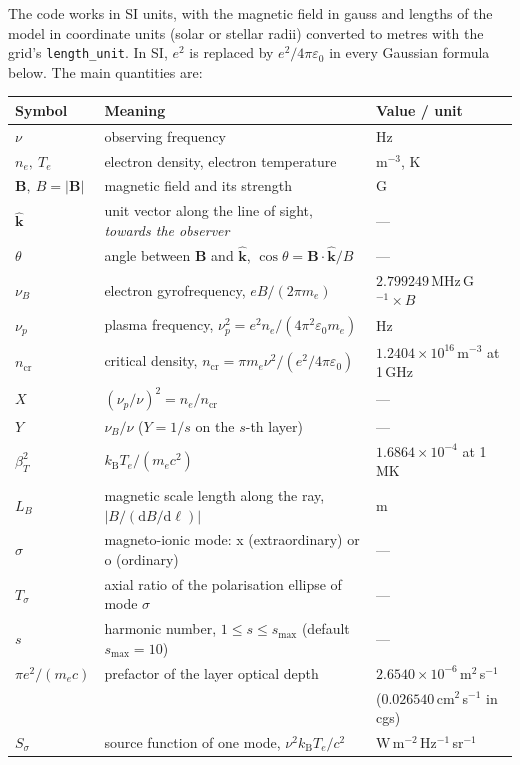 \documentclass[11pt,a4paper]{article}
\newcommand{\code}[1]{\texttt{#1}}
\newcommand{\vect}[1]{\bm{#1}}
\newcommand{\dd}{\mathrm{d}}
\newcommand{\kB}{k_\mathrm{B}}
\newcommand{\ncr}{n_\mathrm{cr}}
\newcommand{\nuB}{\nu_B}
\begin{document}
The code works in SI units, with the magnetic field in gauss and lengths of the model in
coordinate units (solar or stellar radii) converted to metres with the grid's
\code{length\_unit}. In SI, $e^2$ is replaced by $e^2/4\pi\varepsilon_0$ in every Gaussian
formula below. The main quantities are:

\begin{center}
\small
\begin{longtable}{@{}l p{8.3cm} l@{}}
\toprule
Symbol & Meaning & Value / unit \\
\midrule
$\nu$ & observing frequency & Hz \\
$n_e,\ T_e$ & electron density, electron temperature & m$^{-3}$, K \\
$\vect B,\ B=|\vect B|$ & magnetic field and its strength & G \\
$\hat{\vect k}$ & unit vector along the line of sight, \emph{towards the observer} & --- \\
$\theta$ & angle between $\vect B$ and $\hat{\vect k}$, $\cos\theta=\vect B\cdot\hat{\vect k}/B$ & --- \\
$\nuB$ & electron gyrofrequency, $eB/(2\pi m_e)$ & $2.799249$\,MHz\,G$^{-1}\times B$ \\
$\nu_p$ & plasma frequency, $\nu_p^2=e^2n_e/(4\pi^2\varepsilon_0 m_e)$ & Hz \\
$\ncr$ & critical density, $\ncr=\pi m_e\nu^2/(e^2/4\pi\varepsilon_0)$ & $1.2404\times10^{16}$\,m$^{-3}$ at 1\,GHz \\
$X$ & $(\nu_p/\nu)^2=n_e/\ncr$ & --- \\
$Y$ & $\nuB/\nu$ ($Y=1/s$ on the $s$-th layer) & --- \\
$\beta_T^2$ & $\kB T_e/(m_ec^2)$ & $1.6864\times10^{-4}$ at 1\,MK \\
$L_B$ & magnetic scale length along the ray, $|B/(\dd B/\dd\ell)|$ & m \\
$\sigma$ & magneto-ionic mode: x (extraordinary) or o (ordinary) & --- \\
$T_\sigma$ & axial ratio of the polarisation ellipse of mode $\sigma$ & --- \\
$s$ & harmonic number, $1\le s\le s_\text{max}$ (default $s_\text{max}=10$) & --- \\
$\pi e^2/(m_ec)$ & prefactor of the layer optical depth & $2.6540\times10^{-6}$\,m$^2$\,s$^{-1}$ \\
& & ($0.026540$\,cm$^2$\,s$^{-1}$ in cgs) \\
$S_\sigma$ & source function of one mode, $\nu^2\kB T_e/c^2$ & W\,m$^{-2}$\,Hz$^{-1}$\,sr$^{-1}$ \\
\bottomrule
\end{longtable}
\end{center}
\end{document}
